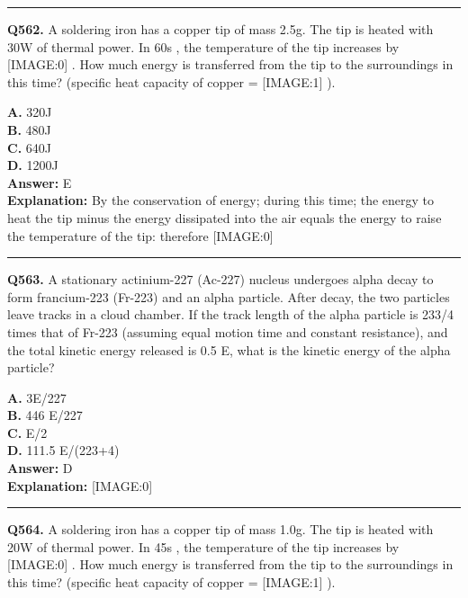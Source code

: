 \documentclass[12pt]{article}
\begin{document}
\hrule
\vspace{1em}


\noindent
\textbf{Q562.} A soldering iron has a copper tip of mass 2.5g.
The tip is heated with 30W
of thermal power. In 60s
, the temperature of the tip increases by
[IMAGE:0]
.
How much energy is transferred from the tip to the surroundings in this time? (specific heat capacity of copper =
[IMAGE:1]
).



\textbf{A.} 320J \\
\textbf{B.} 480J \\
\textbf{C.} 640J \\
\textbf{D.} 1200J \\

\textbf{Answer:} E \\
\textbf{Explanation:} By the conservation of energy; during this time; the energy to heat the tip minus the energy dissipated into the air equals the energy to raise the temperature of the tip: therefore
[IMAGE:0]

\hrule
\vspace{1em}


\noindent
\textbf{Q563.} A stationary actinium-227 (Ac-227) nucleus undergoes alpha decay to form francium-223 (Fr-223) and an alpha particle. After decay, the two particles leave tracks in a cloud chamber. If the track length of the alpha particle is
233/4
times that of Fr-223 (assuming equal motion time and constant resistance), and the total kinetic energy released is
0.5
E, what is the kinetic energy of the alpha particle?



\textbf{A.} 3E/227 \\
\textbf{B.} 446
E/227 \\
\textbf{C.} E/2 \\
\textbf{D.} 111.5
E/(223+4) \\

\textbf{Answer:} D \\
\textbf{Explanation:} [IMAGE:0]

\hrule
\vspace{1em}


\noindent
\textbf{Q564.} A soldering iron has a copper tip of mass 1.0g.
The tip is heated with 20W
of thermal power. In 45s
, the temperature of the tip increases by
[IMAGE:0]
.
How much energy is transferred from the tip to the surroundings in this time? (specific heat capacity of copper =
[IMAGE:1]
).
\end{document}
